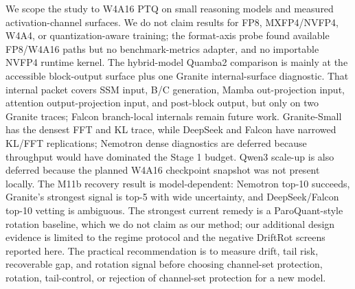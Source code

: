 \documentclass{article}
\begin{document}
We scope the study to W4A16 PTQ on small reasoning models and measured activation-channel surfaces. We do not claim results for FP8, MXFP4/NVFP4, W4A4, or quantization-aware training; the format-axis probe found available FP8/W4A16 paths but no benchmark-metrics adapter, and no importable NVFP4 runtime kernel. The hybrid-model Quamba2 comparison is mainly at the accessible block-output surface plus one Granite internal-surface diagnostic. That internal packet covers SSM input, B/C generation, Mamba out-projection input, attention output-projection input, and post-block output, but only on two Granite traces; Falcon branch-local internals remain future work. Granite-Small has the densest FFT and KL trace, while DeepSeek and Falcon have narrowed KL/FFT replications; Nemotron dense diagnostics are deferred because throughput would have dominated the Stage 1 budget. Qwen3 scale-up is also deferred because the planned W4A16 checkpoint snapshot was not present locally. The M11b recovery result is model-dependent: Nemotron top-10 succeeds, Granite's strongest signal is top-5 with wide uncertainty, and DeepSeek/Falcon top-10 vetting is ambiguous. The strongest current remedy is a ParoQuant-style rotation baseline, which we do not claim as our method; our additional design evidence is limited to the regime protocol and the negative DriftRot screens reported here. The practical recommendation is to measure drift, tail risk, recoverable gap, and rotation signal before choosing channel-set protection, rotation, tail-control, or rejection of channel-set protection for a new model.
\end{document}
